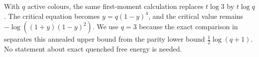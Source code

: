 \begin{remark}\label{rem:activity}
With $q$ active colours, the same first-moment calculation replaces
$t\log3$ by $t\log q$.  The critical equation becomes
$y=q(1-y)^4$, and the critical value remains
$-\log((1+y)(1-y)^2)$.  We use $q=3$ because the exact comparison in
 separates this annealed upper bound from the parity
lower bound $\frac12\log(q+1)$.  No statement about exact quenched free
energy is needed.
\end{remark}
